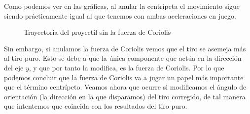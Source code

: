 \documentclass{article}
\begin{document}
Como podemos ver en las gráficas, al anular la centrípeta el movimiento sigue siendo prácticamente igual al que tenemos con ambas aceleraciones en juego.
\begin{figure}[H]
 \centering
 \caption{Trayectoria del proyectil sin la fuerza de Coriolis}
\label{fig1}
\end{figure}
Sin embargo, si anulamos la fuerza de Coriolis vemos que el tiro se asemeja más al tiro puro. Esto se debe a que la única componente que actúa en la dirección del eje $y$, y que por tanto la modifica, es la fuerza de Coriolis. Por lo que podemos concluir que la fuerza de Coriolis va a jugar un papel más importante que el término centrípeto.\newline\linebreak
Veamos ahora que ocurre si modificamos el ángulo de orientación (la dirección en la que disparamos) del tiro corregido, de tal manera que intentemos que coincida con los resultados del tiro puro.
\end{document}
